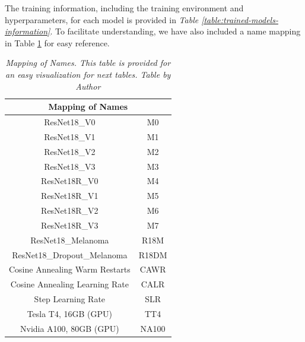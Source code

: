 The training information, including the training environment and hyperparameters, for each model is provided in \textit{Table \ref{table:trained-models-information}}. To facilitate understanding, we have also included a name mapping in Table \ref{table:mapping-names} for easy reference.

\begin{table}[H]
\centering
\begin{tabular}{cc}
    \toprule

		\multicolumn{2}{c}{\textbf{Mapping of Names}} \\
    \midrule
ResNet18\_V0 & M0 \\
ResNet18\_V1 & M1 \\
ResNet18\_V2 & M2 \\
ResNet18\_V3 & M3 \\
ResNet18R\_V0  & M4 \\
ResNet18R\_V1  & M5 \\
ResNet18R\_V2 & M6 \\
ResNet18R\_V3  & M7 \\
ResNet18\_Melanoma & R18M \\
ResNet18\_Dropout\_Melanoma & R18DM \\
Cosine Annealing Warm Restarts & CAWR \\
Cosine Annealing Learning Rate & CALR \\
Step Learning Rate & SLR \\
Tesla T4, 16GB (GPU) & TT4 \\
Nvidia A100, 80GB (GPU) & NA100 \\ \bottomrule
\end{tabular}
\caption[Mapping of Names.]
  {\textit{Mapping of Names. This table is provided for an easy visualization for next tables.
  Table by Author}}
{\label{table:mapping-names}}
\end{table}

\newpage

